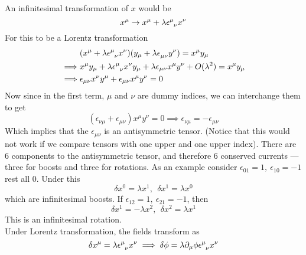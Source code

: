 \documentclass[11pt]{article}
\newcommand{\del}{\partial}
\numberwithin{equation}{section}
\begin{document}
    An infinitesimal transformation of \(x\) would be 
    \begin{equation*}
        x^\mu \to x^\mu + \lambda \epsilon\indices{^\mu_\nu} x^\nu
    \end{equation*}
    For this to be a Lorentz transformation 
    \begin{align*}
        &(x^\mu + \lambda \epsilon\indices{^\mu_\nu} x^\nu)(y_\mu + \lambda \epsilon\indices{_\mu_\nu} y^\nu) = x^\mu y_\mu \\
        \implies & x^\mu y_\mu + \lambda \epsilon\indices{^\mu_\nu} x^\nu y_\mu + \lambda\epsilon_{\mu\nu}x^\mu y^\nu + O(\lambda^2) = x^\mu y_\mu\\
        \implies & \epsilon_{\mu\nu}x^\nu y^\mu + \epsilon_{\mu\nu} x^\mu y^\nu = 0
    \end{align*}
    Now since in the first term, \(\mu\) and \(\nu\) are dummy indices, we can interchange them to get 
    \begin{equation*}
        \left(\epsilon_{\nu\mu}+ \epsilon_{\mu\nu}\right) x^\mu y^\nu = 0\implies  \epsilon_{\nu\mu}= - \epsilon_{\mu\nu}
    \end{equation*}
    Which implies that the \(\epsilon_{\mu\nu}\) is an antisymmetric tensor. (Notice that this would not work if we compare tensors with one upper and one upper index). There are 6 components to the antisymmetric tensor, and therefore 6 conserved currents — three for boosts and three for rotations. As an example consider \(\epsilon_{01} = 1,~\epsilon_{10} = -1\) rest all 0. Under this 
    \begin{equation*}
        \delta x^0 = \lambda x^1,~~\delta x^1 = \lambda x^0
    \end{equation*}
    which are infinitesimal boosts. If \(\epsilon_{12} = 1,~\epsilon_{21} = -1\), then 
    \begin{equation*}
        \delta x^1 = -\lambda x^2,~~\delta x^2 = \lambda x^1
    \end{equation*}
    This is an infinitesimal rotation. \\

    Under Lorentz transformation, the fields transform as 
    \begin{equation*}
        \delta x^\mu = \lambda \epsilon\indices{^\mu_\nu} x^\nu \implies \delta \phi =\lambda \del_\mu \phi \epsilon\indices{^\mu_\nu} x^\nu
    \end{equation*}
\end{document}
